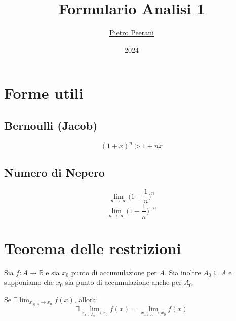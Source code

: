 \documentclass{article}
\title{Formulario Analisi 1}
\author{\href{https://github.com/pietropeerani}{Pietro Peerani}}
\date{2024}
\begin{document}
    
    \maketitle
    \newpage
    \thispagestyle{plain} %
    \tableofcontents
    \newpage
    
    \section{Forme utili}
    \subsection{Bernoulli (Jacob)}
    \begin{equation}
        (1+x)^n > 1+nx
    \end{equation}
    
    \subsection{Numero di Nepero}
    \begin{equation}
        \lim_{n\rightarrow\infty}\biggl(1+\frac{1}{n}\biggl)^n
    \end{equation}
    \begin{equation}
        \lim_{n\rightarrow\infty}\biggl(1-\frac{1}{n}\biggl)^{-n}
    \end{equation}
    

    

    

    \section{Teorema delle restrizioni}
    Sia $f:A\to\mathbb{R}$ e sia $x_0$ punto di accumulazione per $A$. Sia inoltre $A_0 \subseteq A$ e supponiamo che $x_0$ sia punto di accumulazione anche per $A_0$.
    
    Se $\exists \lim_{x_{\in A}\to x_0}f(x)$, allora:
    \begin{equation}
        \exists \lim_{x_{x\in A_0}\to x_0} f(x) = \lim_{x_{x\in A}\to x_0} f(x)
    \end{equation}
\end{document}
